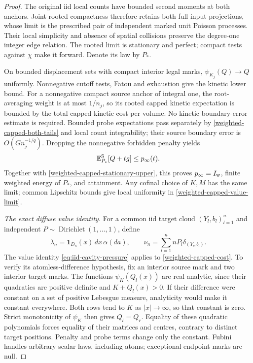 \documentclass[11pt,reqno]{amsart}
\theoremstyle{definition}
\theoremstyle{remark}
\numberwithin{equation}{section}
\newcommand{\E}{\mathbb E}
\begin{document}
\begin{proof}
The original iid local counts have bounded second moments at both
anchors. Joint rooted compactness therefore retains both full input
projections, whose limit is the prescribed pair of independent marked
unit Poisson processes. Their local simplicity and absence of spatial
collisions preserve the degree-one integer edge relation. The rooted
limit is stationary and perfect; compact tests against \(\chi\)
make it forward. Denote its law by \(P_*\).

On bounded displacement sets with compact interior legal marks,
\(\psi_{K_j}(Q)\to Q\) uniformly. Nonnegative cutoff tests, Fatou
and exhaustion give the kinetic lower bound. For a nonnegative compact
source anchor of integral one, the root-averaging weight is at most
\(1/n_j\), so its rooted capped kinetic expectation is bounded by
the total capped kinetic cost per volume. No kinetic boundary-error
estimate is required. Bounded probe expectations pass separately by
\eqref{weighted-capped-both-tails} and local count integrability;
their source boundary error is \(O(Gn_j^{-1/q})\). Dropping the
nonnegative forbidden penalty yields
\begin{equation}
\label{weighted-capped-attainment}
                    \E_{P_*}^{\rm S}[Q+tg]\le p_\infty(t).
\end{equation}
Together with \eqref{weighted-capped-stationary-upper}, this proves
\(p_\infty=I_{\rm w}\), finite weighted energy of \(P_*\), and
attainment. Any cofinal choice of \(K,M\) has the same limit; common
Lipschitz bounds give local uniformity in \eqref{weighted-capped-value-limit}.

\emph{The exact diffuse value identity.}
For a common iid target cloud \((Y_l,b_l)_{l=1}^n\) and independent
\(P\sim\operatorname{Dirichlet}(1,\ldots,1)\), define
\begin{equation}
\label{weighted-capped-dirichlet-marginals}
 \lambda_n=\mathbf1_{D_n}(x)\,dx\,\alpha(da),\qquad
 \nu_n=\sum_{l=1}^n nP_l\delta_{(Y_l,b_l)}.
\end{equation}
The value identity \eqref{eq:iid-cavity-pressure} applies to
\eqref{weighted-capped-cost}. To verify its atomless-difference
hypothesis, fix an interior source mark and two interior target marks.
The functions \(\psi_K(Q_l(x))\) are real analytic, since their
quadratics are positive definite and \(K+Q_l(x)>0\). If their
difference were constant on a set of positive Lebesgue measure,
analyticity would make it constant everywhere. Both rows tend to
\(K\) as \(|x|\to\infty\), so that constant is zero. Strict
monotonicity of \(\psi_K\) then gives \(Q_l=Q_r\). Equality of
these quadratic polynomials forces equality of their matrices and
centres, contrary to distinct target positions. Penalty and probe
terms change only the constant. Fubini handles arbitrary scalar laws,
including atoms; exceptional endpoint marks are null.


\end{proof}
\end{document}
